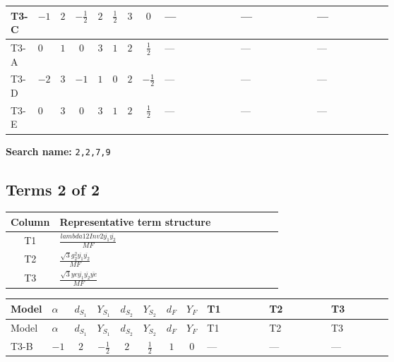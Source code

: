\documentclass[8pt]{article}
\begin{document}
\begin{landscape}
\begin{longtable}{@{}llcccccc >{\raggedright\arraybackslash}p{0.21\linewidth} >{\raggedright\arraybackslash}p{0.21\linewidth} >{\raggedright\arraybackslash}p{0.21\linewidth}@{}}
\midrule
T3-C & $-1$ & $2$ & $-\frac{1}{2}$ & $2$ & $\frac{1}{2}$ & $3$ & $0$ & --- & --- & --- \\
\midrule
T3-A & $0$ & $1$ & $0$ & $3$ & $1$ & $2$ & $\frac{1}{2}$ & --- & --- & --- \\
\midrule
T3-D & $-2$ & $3$ & $-1$ & $1$ & $0$ & $2$ & $-\frac{1}{2}$ & --- & --- & --- \\
\midrule
T3-E & $0$ & $3$ & $0$ & $3$ & $1$ & $2$ & $\frac{1}{2}$ & --- & --- & --- \\
\midrule
\bottomrule
\end{longtable}
\clearpage
\noindent\textbf{Search name: }\texttt{2,2,7,9}\par\smallskip
\subsection*{Terms 2 of 2}
\begin{center}
\begin{tabular}{@{}c >{\raggedright\arraybackslash}p{0.82\linewidth}@{}}
\toprule
Column & Representative term structure \\
\midrule
T1 & \(\displaystyle \frac{lambda12Inv2 \overline{y_{1}} \overline{y_{2}}}{MF}\) \\
\midrule
T2 & \(\displaystyle \frac{\sqrt{3} g_{2}^{2} \overline{y_{1}} \overline{y_{2}}}{MF}\) \\
\midrule
T3 & \(\displaystyle \frac{\sqrt{3} ye \overline{y_{1}} \overline{y_{2}} \overline{ye}}{MF}\) \\
\midrule
\bottomrule
\end{tabular}
\end{center}
\smallskip
\tiny
\begin{longtable}{@{}llcccccc >{\raggedright\arraybackslash}p{0.21\linewidth} >{\raggedright\arraybackslash}p{0.21\linewidth} >{\raggedright\arraybackslash}p{0.21\linewidth}@{}}
\toprule
Model & $\alpha$ & $d_{S_1}$ & $Y_{S_1}$ & $d_{S_2}$ & $Y_{S_2}$ & $d_F$ & $Y_F$ & T1 & T2 & T3 \\
\midrule
\endfirsthead
\toprule
Model & $\alpha$ & $d_{S_1}$ & $Y_{S_1}$ & $d_{S_2}$ & $Y_{S_2}$ & $d_F$ & $Y_F$ & T1 & T2 & T3 \\
\midrule
\endhead
T3-B & $-1$ & $2$ & $-\frac{1}{2}$ & $2$ & $\frac{1}{2}$ & $1$ & $0$ & --- & --- & --- \\
\midrule

\end{longtable}
\end{landscape}
\end{document}
